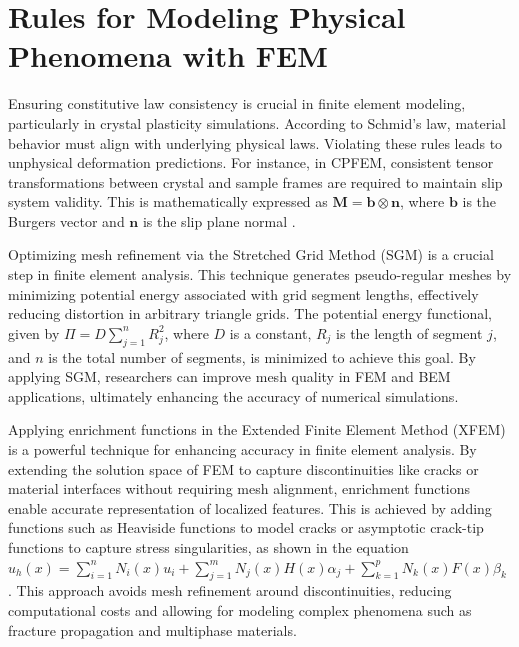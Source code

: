 \documentclass[12pt, a4paper]{article}
\begin{document}
\section{Rules for Modeling Physical Phenomena with FEM}
\label{sec:9dd02781-acdf-48d5-87ad-6682908a49f5}

Ensuring constitutive law consistency is crucial in finite element modeling, particularly in crystal plasticity simulations. According to Schmid's law, material behavior must align with underlying physical laws. Violating these rules leads to unphysical deformation predictions. For instance, in CPFEM, consistent tensor transformations between crystal and sample frames are required to maintain slip system validity. This is mathematically expressed as \(\mathbf{M} = \mathbf{b} \otimes \mathbf{n}\), where \(\mathbf{b}\) is the Burgers vector and \(\mathbf{n}\) is the slip plane normal \cite{src:wiki_crystal_plasticity-8efc86f43eeb}.

Optimizing mesh refinement via the Stretched Grid Method (SGM) is a crucial step in finite element analysis. This technique generates pseudo-regular meshes by minimizing potential energy associated with grid segment lengths, effectively reducing distortion in arbitrary triangle grids. The potential energy functional, given by \(\Pi = D \sum_{j=1}^{n} R_j^2\), where \(D\) is a constant, \(R_j\) is the length of segment \(j\), and \(n\) is the total number of segments, is minimized to achieve this goal. By applying SGM, researchers can improve mesh quality in FEM and BEM applications, ultimately enhancing the accuracy of numerical simulations.

Applying enrichment functions in the Extended Finite Element Method (XFEM) is a powerful technique for enhancing accuracy in finite element analysis. By extending the solution space of FEM to capture discontinuities like cracks or material interfaces without requiring mesh alignment, enrichment functions enable accurate representation of localized features. This is achieved by adding functions such as Heaviside functions to model cracks or asymptotic crack-tip functions to capture stress singularities, as shown in the equation \(u_h(x) = \sum_{i=1}^{n} N_i(x) u_i + \sum_{j=1}^{m} N_j(x) H(x) \alpha_j + \sum_{k=1}^{p} N_k(x) F(x) \beta_k\) \cite{src:wiki_extended_finite_element_method-1f2020ac8783}. This approach avoids mesh refinement around discontinuities, reducing computational costs and allowing for modeling complex phenomena such as fracture propagation and multiphase materials.
\end{document}
